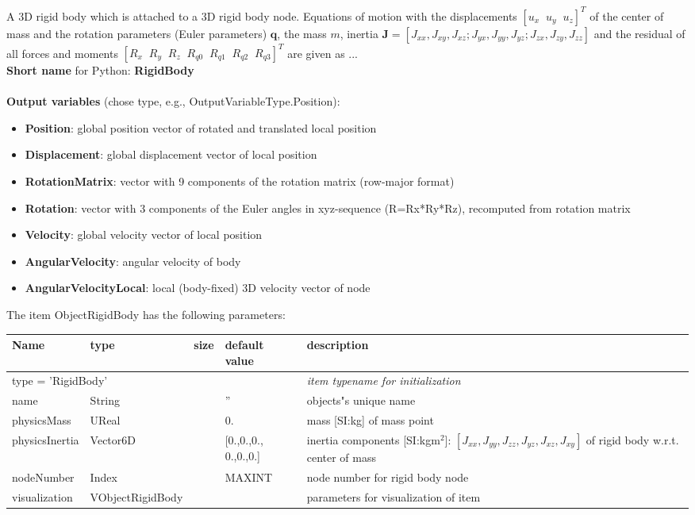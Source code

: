 A 3D rigid body which is attached to a 3D rigid body node. Equations of motion with the displacements $[u_x\;\; u_y\;\; u_z]^T$ of the center of mass and the rotation parameters (Euler parameters) $\mathbf{q}$, the mass $m$, inertia $\mathbf{J} = [J_{xx}, J_{xy}, J_{xz}; J_{yx}, J_{yy}, J_{yz}; J_{zx}, J_{zy}, J_{zz}]$ and the residual of all forces and moments $[R_x\;\; R_y\;\; R_z\;\; R_{q0}\;\; R_{q1}\;\; R_{q2}\;\; R_{q3}]^T$ are given as ...
 \\
{\bf Short name} for Python: {\bf RigidBody}
 \\\\ 
{\bf Output variables} (chose type, e.g., OutputVariableType.Position): 
\begin{itemize}
    \item {\bf Position}: global position vector of rotated and translated local position
    \item {\bf Displacement}: global displacement vector of local position
    \item {\bf RotationMatrix}: vector with 9 components of the rotation matrix (row-major format)
    \item {\bf Rotation}: vector with 3 components of the Euler angles in xyz-sequence (R=Rx*Ry*Rz), recomputed from rotation matrix
    \item {\bf Velocity}: global velocity vector of local position
    \item {\bf AngularVelocity}: angular velocity of body
    \item {\bf AngularVelocityLocal}: local (body-fixed) 3D velocity vector of node
\end{itemize}
The item ObjectRigidBody has the following parameters:
\begin{center}
  \footnotesize
  \begin{longtable}{| p{4.5cm} | p{2.5cm} | p{0.5cm} | p{2.5cm} | p{6cm} |}
    \hline
    \bf Name & \bf type & \bf size & \bf default value & \bf description \\ \hline
    \multicolumn{4}{l}{\parbox{10cm}{type = 'RigidBody'}} & \multicolumn{1}{l}{\parbox{6cm}{\it item typename for initialization}}\\ \hline
    name &     String &      &     '' &     objects"s unique name\\ \hline
    physicsMass &     UReal &      &     0. &     mass [SI:kg] of mass point\\ \hline
    physicsInertia &     Vector6D &      &     [0.,0.,0., 0.,0.,0.] &     inertia components [SI:kgm$^2$]: $[J_{xx}, J_{yy}, J_{zz}, J_{yz}, J_{xz}, J_{xy}]$ of rigid body w.r.t. center of mass\\ \hline
    nodeNumber &     Index &      &     MAXINT &     node number for rigid body node\\ \hline
    visualization & VObjectRigidBody & & & parameters for visualization of item \\ \hline
	  \end{longtable}
	\end{center}
